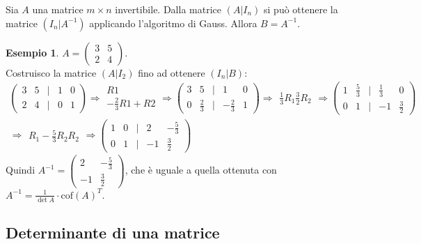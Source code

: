 \documentclass[a4paper]{article}
\theoremstyle{definition}
\newtheorem*{es}{Esempio}
\begin{document}
Sia $A$ una matrice $m \times n$ invertibile.
Dalla matrice $(A|I_n)$ si può ottenere la matrice $(I_n|A^{-1})$ applicando l'algoritmo di Gauss.
Allora $B=A^{-1}$.
\begin{es}
	$A = \begin{pmatrix}
		3 & 5 \\
		2 & 4
	\end{pmatrix}$. \\
	Costruisco la matrice $(A|I_2)$ fino ad ottenere $(I_n|B)$:
	\begin{align*}
		\begin{pmatrix}
			3 & 5 & \mid & 1 & 0 \\
			2 & 4 & \mid & 0 & 1
		\end{pmatrix} \Rightarrow \begin{matrix}
			R1 \\
			- \frac{2}{3}R1 + R2
		\end{matrix} \Rightarrow \begin{pmatrix}
			3 & 5 & \mid & 1 & 0 \\
			0 & \frac{2}{3} & \mid & - \frac{2}{3} & 1
		\end{pmatrix} \Rightarrow \begin{matrix}
			\frac{1}{3}R_1
			\frac{3}{2}R_2
		\end{matrix} \Rightarrow \begin{pmatrix}
			1 & \frac{5}{3} & \mid & \frac{1}{3} & 0 \\
			0 & 1 & \mid & -1 & \frac{3}{2}
		\end{pmatrix} \\ \Rightarrow \begin{matrix}
			R_1 - \frac{5}{3}R_2
			R_2
		\end{matrix} \Rightarrow \begin{pmatrix}
			1 & 0 & \mid & 2 & - \frac{5}{3} \\
			0 & 1 & \mid & -1 & \frac{3}{2}
		\end{pmatrix}
	\end{align*}
	Quindi $A^{-1} = \begin{pmatrix}
		2 & - \frac{5}{3} \\
		-1 & \frac{3}{2}
	\end{pmatrix}$, che è uguale a quella ottenuta con $A^{-1} = \frac{1}{\det A} \cdot \text{cof}(A)^T$.
\end{es}

\subsection{Determinante di una matrice}
\end{document}
